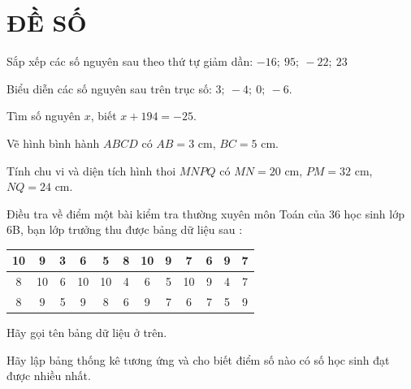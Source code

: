 \section{ĐỀ SỐ \thesection }%
\setcounter{bt}{0}

\begin{bt} \textbf{ }
	\begin{listEX}
		\item Sắp xếp các số nguyên sau theo thứ tự giảm dần: $-16 ;\ 95 ;\ -22 ;\ 23$
		\item Biểu diễn các số nguyên sau trên trục số: $3 ;\ -4 ;\ 0 ;\ -6$.
		\item Tìm số nguyên $x$, biết $x+194=-25$.
	\end{listEX}
	
\end{bt}

\begin{bt} \textbf{ }
	\begin{listEX}
		\item Vẽ hình bình hành $ABCD$ có $AB=3$ cm, $BC=5$ cm.
		\item Tính chu vi và diện tích hình thoi $MNPQ$ có $MN=20$ cm, $ PM=32$ cm, $NQ=24$ cm.
	\end{listEX}
\end{bt}


\begin{bt} Điều tra về điểm một bài kiểm tra thường xuyên môn Toán của 36 học sinh lớp 6B, bạn lớp trưởng thu được bảng dữ liệu sau :
	
	\begin{center}
		\begin{tabular}{|c|c|c|c|c|c|c|c|c|c|c|c|}
			\hline
			10 & 9 & 3 & 6 & 5 & 8 & 10 & 9 & 7 & 6 & 9 & 7 \\
			\hline
			8 & 10 & 6 & 10 & 10 & 4 & 6 & 5 & 10 & 9 & 4 & 7 \\
			\hline
			8 & 9 & 5 & 9 & 8 & 6 & 9 & 7 & 6 & 7 & 5 & 9 \\
			\hline
		\end{tabular}
	\end{center}
	\begin{listEX}
		\item Hãy gọi tên bảng dữ liệu ở trên.
		\item Hãy lập bảng thống kê tương ứng và cho biết điểm số nào có số học sinh đạt được nhiều nhất.
	\end{listEX}	
	
\end{bt}


